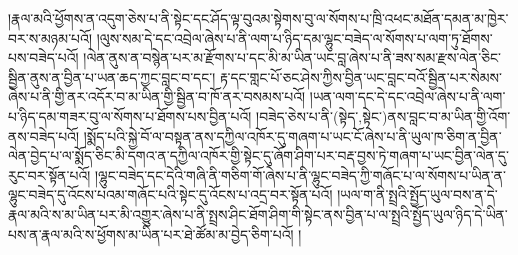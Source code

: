 །རྣལ་མའི་ཕྱོགས་ན་འདུག་ཅེས་པ་ནི་སྟེང་དང་ཤོད་ལྟ་བུའམ་སྟེགས་བུ་ལ་སོགས་པ་ཁྲི་འཕང་མཐོན་དམན་མ་ཁྱེར་བར་ས་མཉམ་པའོ། །ལུས་སམ་དེ་དང་འབྲེལ་ཞེས་པ་ནི་ལག་པ་ཉིད་དམ་ལྷུང་བཟེད་ལ་སོགས་པ་ལག་ཏུ་ཐོགས་པས་བཟེད་པའོ། །ལེན་ནུས་ན་བསྙེན་པར་མ་རྫོགས་པ་དང་མི་མ་ཡིན་ཡང་བླ་ཞེས་པ་ནི་ཟས་སམ་རྫས་ལེན་ཅིང་སྦྱིན་ནུས་ན་བྱིན་པ་ཡན་ཆད་ཀྱང་བླང་བ་དང་། རྟ་དང་གླང་པོ་ཅང་ཤེས་ཀྱིས་བྱིན་ཡང་བླང་བའོ་སྦྱིན་པར་སེམས་ཞེས་པ་ནི་གྱི་ནར་འདོར་བ་མ་ཡིན་གྱི་སྦྱིན་བ་ཁོ་ནར་བསམས་པའོ། །ཡན་ལག་དང་དེ་དང་འབྲེལ་ཞེས་པ་ནི་ལག་པ་ཉིད་དམ་གཟར་བུ་ལ་སོགས་པ་ཐོགས་པས་བྱིན་པའོ། །བཟེད་ཅེས་པ་ནི་(སྟེད་‚སྟེང་)ནས་བླང་བ་མ་ཡིན་གྱི་འོག་ནས་བཟེད་པའོ། །སྨོད་པའི་སྐྱེ་བོ་ལ་བསྟན་ནས་དཀྱིལ་འཁོར་དུ་གཞག་པ་ཡང་ངོ་ཞེས་པ་ནི་ཡུལ་ཁ་ཅིག་ན་བྱིན་ལེན་བྱེད་པ་ལ་སྨོད་ཅིང་མི་དགའ་ན་དཀྱིལ་འཁོར་གྱི་སྟེང་དུ་ཞོག་ཤིག་པར་བརྡ་བྱས་ཏེ་གཞག་པ་ཡང་བྱིན་ལེན་དུ་རུང་བར་སྟོན་པའོ། །ལྷུང་བཟེད་དང་དེའི་གཞི་ནི་གཅིག་གོ་ཞེས་པ་ནི་ལྷུང་བཟེད་ཀྱི་གཞོང་པ་ལ་སོགས་པ་ཡིན་ན་ལྷུང་བཟེད་དུ་འོངས་པའམ་གཞོང་པའི་སྟེང་དུ་འོངས་པ་འདྲ་བར་སྟོན་པའོ། །ཡལ་ག་ནི་སྤྲའི་སྤྱོད་ཡུལ་བས་ན་དེ་རྣལ་མའི་ས་མ་ཡིན་པར་མི་འགྱུར་ཞེས་པ་ནི་སྤྲས་ཤིང་ཐོག་ཤིག་གི་སྟེང་ནས་བྱིན་པ་ལ་སྤྲའི་སྤྱོད་ཡུལ་ཉིད་དེ་ཡིན་པས་ན་རྣལ་མའི་ས་ཕྱོགས་མ་ཡིན་པར་ཐེ་ཚོམ་མ་བྱེད་ཅིག་པའོ། །
